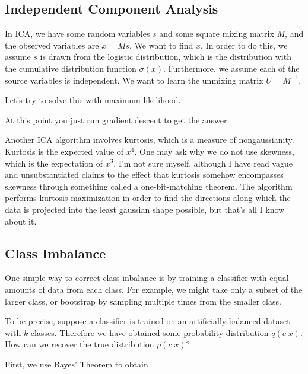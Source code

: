 \documentclass[12pt]{article}
\begin{document}
\subsection{Independent Component Analysis}

In ICA, we have some random variables $s$ and some square mixing matrix $M$, and the observed variables are $x = Ms$. We want to find $x$. In order to do this, we assume $s$ is drawn from the logistic distribution, which is the distribution with the cumulative distribution function $\sigma(x)$. Furthermore, we assume each of the source variables is independent. We want to learn the unmixing matrix $U = M^{-1}$. 

Let's try to solve this with maximum likelihood.


At this point you just run gradient descent to get the answer. 

Another ICA algorithm involves kurtosis, which is a measure of nongaussianity. Kurtosis is the expected value of $x^4$. One may ask why we do not use skewness, which is the expectation of $x^3$. I'm not sure myself, although I have read vague and unsubstantiated claims to the effect that kurtosis somehow encompasses skewness through something called a one-bit-matching theorem.
The algorithm performs kurtosis maximization in order to find the directions along which the data is projected into the least gaussian shape possible, but that's all I know about it.

\subsection{Class Imbalance}

One simple way to correct class inbalance is by training a classifier with equal amounts of data from each class. For example, we might take only a subset of the larger class, or bootstrap by sampling multiple times from the smaller class.

To be precise, suppose a classifier is trained on an artificially balanced dataset with $k$ classes. Therefore we have obtained some probability distribution $q(c|x)$. How can we recover the true distribution $p(c|x)$?

First, we use Bayes' Theorem to obtain
\end{document}
